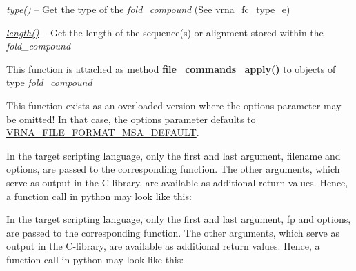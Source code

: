 \begin{DoxyRefList}
\begin{DoxyItemize}
\item {\itshape \mbox{\hyperlink{group__fold__compound_a391bcf8ac5997784aaf780cdd251c464}{type()}}} -- Get the type of the {\itshape fold\+\_\+compound} (See \mbox{\hyperlink{group__fold__compound_ga01a4ff86fa71deaaa5d1abbd95a1447d}{vrna\+\_\+fc\+\_\+type\+\_\+e}})
\item {\itshape \mbox{\hyperlink{group__fold__compound_a95fbfed770b858e50c766505dc4bf998}{length()}}} -- Get the length of the sequence(s) or alignment stored within the {\itshape fold\+\_\+compound} 
\end{DoxyItemize}
\item[Global \mbox{\hyperlink{group__command__files_gadbe8c9622f7bcc6dcbe3448b98df8656}{vrna\+\_\+file\+\_\+commands\+\_\+apply}} (vrna\+\_\+fold\+\_\+compound\+\_\+t $\ast$vc, const char $\ast$filename, unsigned int options)]\label{wrappers__wrappers000022}%
%
 This function is attached as method {\bfseries{file\+\_\+commands\+\_\+apply()}} to objects of type {\itshape fold\+\_\+compound}  
\item[Global \mbox{\hyperlink{group__file__formats__msa_gade4fa8136ebb2d0f7eb3f8b59a8658e3}{vrna\+\_\+file\+\_\+msa\+\_\+detect\+\_\+format}} (const char $\ast$filename, unsigned int options)]\label{wrappers__wrappers000077}%
%
 This function exists as an overloaded version where the {\ttfamily options} parameter may be omitted! In that case, the {\ttfamily options} parameter defaults to \mbox{\hyperlink{group__file__formats__msa_ga4acc255373831856a8417b68de8a94c0}{V\+R\+N\+A\+\_\+\+F\+I\+L\+E\+\_\+\+F\+O\+R\+M\+A\+T\+\_\+\+M\+S\+A\+\_\+\+D\+E\+F\+A\+U\+LT}}.  
\item[Global \mbox{\hyperlink{group__file__formats__msa_gad02d5d12bda54611c915a1019323b7be}{vrna\+\_\+file\+\_\+msa\+\_\+read}} (const char $\ast$filename, char $\ast$$\ast$$\ast$names, char $\ast$$\ast$$\ast$aln, char $\ast$$\ast$id, char $\ast$$\ast$structure, unsigned int options)]\label{wrappers__wrappers000078}%
%
 In the target scripting language, only the first and last argument, {\ttfamily filename} and {\ttfamily options}, are passed to the corresponding function. The other arguments, which serve as output in the C-\/library, are available as additional return values. Hence, a function call in python may look like this\+:


\item[Global \mbox{\hyperlink{group__file__formats__msa_gad4203a438622b2df7bc2f16578d54799}{vrna\+\_\+file\+\_\+msa\+\_\+read\+\_\+record}} (F\+I\+LE $\ast$fp, char $\ast$$\ast$$\ast$names, char $\ast$$\ast$$\ast$aln, char $\ast$$\ast$id, char $\ast$$\ast$structure, unsigned int options)]\label{wrappers__wrappers000079}%
%
 In the target scripting language, only the first and last argument, {\ttfamily fp} and {\ttfamily options}, are passed to the corresponding function. The other arguments, which serve as output in the C-\/library, are available as additional return values. Hence, a function call in python may look like this\+:



\end{DoxyRefList}
